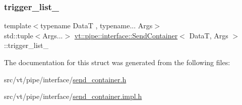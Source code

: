 \subsubsection{\texorpdfstring{trigger\+\_\+list\+\_\+}{trigger\_list\_}}
{\footnotesize\ttfamily template$<$typename DataT , typename... Args$>$ \\
std\+::tuple$<$Args...$>$ \hyperlink{structvt_1_1pipe_1_1interface_1_1_send_container}{vt\+::pipe\+::interface\+::\+Send\+Container}$<$ DataT, Args $>$\+::trigger\+\_\+list\+\_\+\hspace{0.3cm}{\ttfamily [private]}}



The documentation for this struct was generated from the following files\+:\begin{DoxyCompactItemize}
\item 
src/vt/pipe/interface/\hyperlink{send__container_8h}{send\+\_\+container.\+h}\item 
src/vt/pipe/interface/\hyperlink{send__container_8impl_8h}{send\+\_\+container.\+impl.\+h}\end{DoxyCompactItemize}

